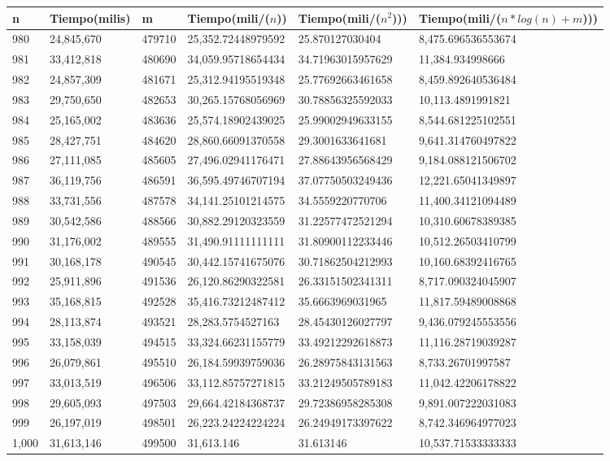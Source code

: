 \begin{table}[H]
\parbox{0.3\textwidth}{
    \begin{tabular}{ | l | l | l | l | l | l |}
    \hline
n   &Tiempo(milis) &m &Tiempo(mili/($n$)) &Tiempo(mili/($n^2$))) &Tiempo(mili/($n*log(n) + m$)))\\ \hline
980	&24,845,670	&479710	&25,352.72448979592	&25.870127030404	&8,475.696536553674\\ \hline
981	&33,412,818	&480690	&34,059.95718654434	&34.71963015957629	&11,384.934998666\\ \hline
982	&24,857,309	&481671	&25,312.94195519348	&25.77692663461658	&8,459.892640536484\\ \hline
983	&29,750,650	&482653	&30,265.15768056969	&30.78856325592033	&10,113.4891991821\\ \hline
984	&25,165,002	&483636	&25,574.18902439025	&25.99002949633155	&8,544.681225102551\\ \hline
985	&28,427,751	&484620	&28,860.66091370558	&29.3001633641681	&9,641.314760497822\\ \hline
986	&27,111,085	&485605	&27,496.02941176471	&27.88643956568429	&9,184.088121506702\\ \hline
987	&36,119,756	&486591	&36,595.49746707194	&37.07750503249436	&12,221.65041349897\\ \hline
988	&33,731,556	&487578	&34,141.25101214575	&34.5559220770706	&11,400.34121094489\\ \hline
989	&30,542,586	&488566	&30,882.29120323559	&31.22577472521294	&10,310.60678389385\\ \hline
990	&31,176,002	&489555	&31,490.91111111111	&31.80900112233446	&10,512.26503410799\\ \hline
991	&30,168,178	&490545	&30,442.15741675076	&30.71862504212993	&10,160.68392416765\\ \hline
992	&25,911,896	&491536	&26,120.86290322581	&26.33151502341311	&8,717.090324045907\\ \hline
993	&35,168,815	&492528	&35,416.73212487412	&35.6663969031965	&11,817.59489008868\\ \hline
994	&28,113,874	&493521	&28,283.5754527163	&28.45430126027797	&9,436.079245553556\\ \hline
995	&33,158,039	&494515	&33,324.66231155779	&33.49212292618873	&11,116.28719039287\\ \hline
996	&26,079,861	&495510	&26,184.59939759036	&26.28975843131563	&8,733.26701997587\\ \hline
997	&33,013,519	&496506	&33,112.85757271815	&33.21249505789183	&11,042.42206178822\\ \hline
998 &29,605,093	&497503	&29,664.42184368737	&29.72386958285308	&9,891.007222031083\\ \hline
999	&26,197,019	&498501	&26,223.24224224224	&26.24949173397622	&8,742.346964977023\\ \hline
1,000	&31,613,146	&499500	&31,613.146	&31.613146	&10,537.71533333333\\ \hline
    \end{tabular}
}
\end{table}

